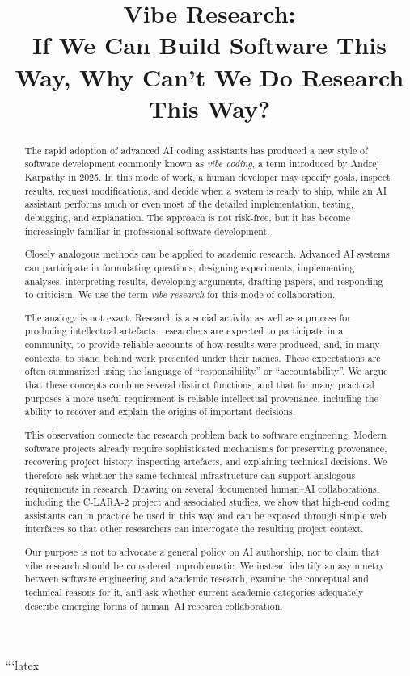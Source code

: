 ```latex
\title{Vibe Research:\\
If We Can Build Software This Way, Why Can't We Do Research This Way?}

\begin{abstract}
The rapid adoption of advanced AI coding assistants has produced a new style of software development commonly known as \emph{vibe coding}, a term introduced by Andrej Karpathy in 2025. In this mode of work, a human developer may specify goals, inspect results, request modifications, and decide when a system is ready to ship, while an AI assistant performs much or even most of the detailed implementation, testing, debugging, and explanation. The approach is not risk-free, but it has become increasingly familiar in professional software development.

Closely analogous methods can be applied to academic research. Advanced AI systems can participate in formulating questions, designing experiments, implementing analyses, interpreting results, developing arguments, drafting papers, and responding to criticism. We use the term \emph{vibe research} for this mode of collaboration.

The analogy is not exact. Research is a social activity as well as a process for producing intellectual artefacts: researchers are expected to participate in a community, to provide reliable accounts of how results were produced, and, in many contexts, to stand behind work presented under their names. These expectations are often summarized using the language of ``responsibility'' or ``accountability''. We argue that these concepts combine several distinct functions, and that for many practical purposes a more useful requirement is reliable intellectual provenance, including the ability to recover and explain the origins of important decisions.

This observation connects the research problem back to software engineering. Modern software projects already require sophisticated mechanisms for preserving provenance, recovering project history, inspecting artefacts, and explaining technical decisions. We therefore ask whether the same technical infrastructure can support analogous requirements in research. Drawing on several documented human--AI collaborations, including the C-LARA-2 project and associated studies, we show that high-end coding assistants can in practice be used in this way and can be exposed through simple web interfaces so that other researchers can interrogate the resulting project context.

Our purpose is not to advocate a general policy on AI authorship, nor to claim that vibe research should be considered unproblematic. We instead identify an asymmetry between software engineering and academic research, examine the conceptual and technical reasons for it, and ask whether current academic categories adequately describe emerging forms of human--AI research collaboration.
\end{abstract}


